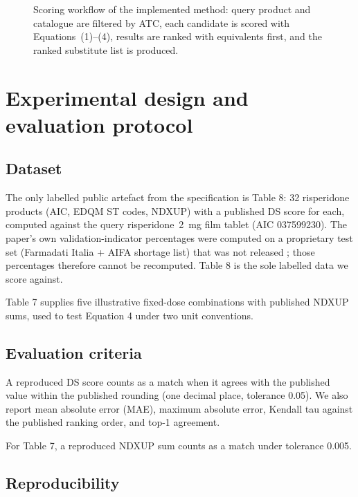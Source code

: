 \documentclass[a4paper]{elsarticle}
\begin{document}
\begin{figure}[htbp]
\centering
\resizebox{\columnwidth}{!}{%
%
}
\caption{Scoring workflow of the implemented method: query product and catalogue are filtered by ATC, each candidate is scored with Equations~(1)--(4), results are ranked with equivalents first, and the ranked substitute list is produced.}
\label{fig:workflow}
\end{figure}

\section{Experimental design and evaluation protocol}
\label{sec:experiment}

\subsection{Dataset}
\label{sec:data}

The only labelled public artefact from the specification is Table 8: 32 risperidone products (AIC, EDQM ST codes, NDXUP) with a published DS score for each, computed against the query risperidone~2~mg film tablet (AIC 037599230). The paper's own validation-indicator percentages were computed on a proprietary test set (Farmadati Italia + AIFA shortage list) that was not released \citep{caviglioli2025medicine}; those percentages therefore cannot be recomputed. Table 8 is the sole labelled data we score against.

Table 7 supplies five illustrative fixed-dose combinations with published NDXUP sums, used to test Equation 4 under two unit conventions.

\subsection{Evaluation criteria}
\label{sec:criteria}

A reproduced DS score counts as a match when it agrees with the published value within the published rounding (one decimal place, tolerance 0.05). We also report mean absolute error (MAE), maximum absolute error, Kendall tau against the published ranking order, and top-1 agreement.

For Table 7, a reproduced NDXUP sum counts as a match under tolerance 0.005.

\subsection{Reproducibility}
\label{sec:repro}
\end{document}
